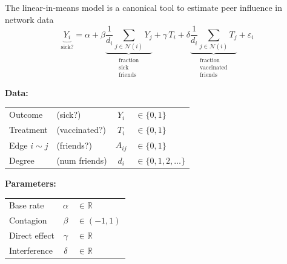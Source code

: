 \documentclass[final]{beamer}
\newcommand{\Ni}{\mathcal N(i)}
\newcommand{\R}{\mathbb{R}}
\newlength{\colwidth}
\begin{document}
\begin{frame}[t]
\begin{columns}[t]
\begin{column}{\colwidth}
            \begin{block}{The linear-in-means model is a canonical tool to estimate peer influence in network data}
                \begin{equation*}
                    \underbrace{Y_i}_\text{sick?} =
                    \alpha +
                    \beta \underbrace{\frac{1}{d_i}\sum_{j \in \Ni} Y_j}_{\substack{\text{fraction} \\ \text{sick} \\ \text{friends}}} +
                    \gamma \, T_i +
                    \delta \underbrace{\frac{1}{d_i}\sum_{j \in \Ni} T_j}_{\substack{\text{fraction} \\ \text{vaccinated} \\ \text{friends}}} +
                    \varepsilon_i
                \end{equation*}

                \begin{minipage}{.5\textwidth}
                    \textbf{Data:}
                    \vspace{3mm}
                    \begin{table}[]
                        \begin{tabular}{llcl}
                            Outcome         & (sick?)       & $Y_i$    & $\in \{0, 1\}$             \\
                            Treatment       & (vaccinated?) & $T_i$    & $\in \{0, 1\}$             \\
                            Edge $i \sim j$ & (friends?)    & $A_{ij}$ & $\in \{0, 1\}$             \\
                            Degree          & (num friends) & $d_i$    & $\in \{0, 1, 2, \dots\}$
                        \end{tabular}
                    \end{table}
                \end{minipage}
                \begin{minipage}{.5\textwidth}
                    \textbf{Parameters:}
                    \vspace{3mm}
                    \begin{table}[]
                        \begin{tabular}{lcl}
                            Base rate     & $\alpha$ & $\in \R$      \\
                            Contagion     & $\beta$  & $\in (-1, 1)$ \\
                            Direct effect & $\gamma$ & $\in \R$      \\
                            Interference  & $\delta$ & $\in \R$
                        \end{tabular}
                    \end{table}
                \end{minipage}


\end{block}
\end{column}
\end{columns}
\end{frame}
\end{document}
